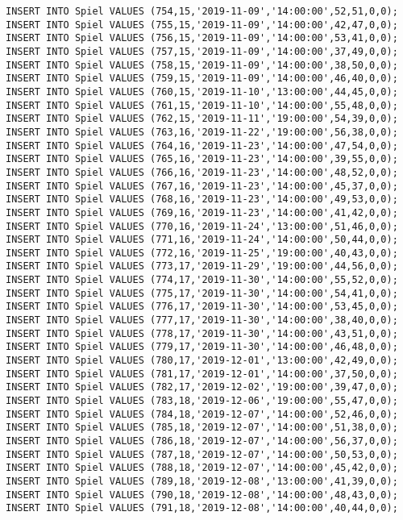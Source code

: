 \documentclass{bschlangaul-aufgabe}
\begin{document}
\begin{verbatim}
INSERT INTO Spiel VALUES (754,15,'2019-11-09','14:00:00',52,51,0,0);
INSERT INTO Spiel VALUES (755,15,'2019-11-09','14:00:00',42,47,0,0);
INSERT INTO Spiel VALUES (756,15,'2019-11-09','14:00:00',53,41,0,0);
INSERT INTO Spiel VALUES (757,15,'2019-11-09','14:00:00',37,49,0,0);
INSERT INTO Spiel VALUES (758,15,'2019-11-09','14:00:00',38,50,0,0);
INSERT INTO Spiel VALUES (759,15,'2019-11-09','14:00:00',46,40,0,0);
INSERT INTO Spiel VALUES (760,15,'2019-11-10','13:00:00',44,45,0,0);
INSERT INTO Spiel VALUES (761,15,'2019-11-10','14:00:00',55,48,0,0);
INSERT INTO Spiel VALUES (762,15,'2019-11-11','19:00:00',54,39,0,0);
INSERT INTO Spiel VALUES (763,16,'2019-11-22','19:00:00',56,38,0,0);
INSERT INTO Spiel VALUES (764,16,'2019-11-23','14:00:00',47,54,0,0);
INSERT INTO Spiel VALUES (765,16,'2019-11-23','14:00:00',39,55,0,0);
INSERT INTO Spiel VALUES (766,16,'2019-11-23','14:00:00',48,52,0,0);
INSERT INTO Spiel VALUES (767,16,'2019-11-23','14:00:00',45,37,0,0);
INSERT INTO Spiel VALUES (768,16,'2019-11-23','14:00:00',49,53,0,0);
INSERT INTO Spiel VALUES (769,16,'2019-11-23','14:00:00',41,42,0,0);
INSERT INTO Spiel VALUES (770,16,'2019-11-24','13:00:00',51,46,0,0);
INSERT INTO Spiel VALUES (771,16,'2019-11-24','14:00:00',50,44,0,0);
INSERT INTO Spiel VALUES (772,16,'2019-11-25','19:00:00',40,43,0,0);
INSERT INTO Spiel VALUES (773,17,'2019-11-29','19:00:00',44,56,0,0);
INSERT INTO Spiel VALUES (774,17,'2019-11-30','14:00:00',55,52,0,0);
INSERT INTO Spiel VALUES (775,17,'2019-11-30','14:00:00',54,41,0,0);
INSERT INTO Spiel VALUES (776,17,'2019-11-30','14:00:00',53,45,0,0);
INSERT INTO Spiel VALUES (777,17,'2019-11-30','14:00:00',38,40,0,0);
INSERT INTO Spiel VALUES (778,17,'2019-11-30','14:00:00',43,51,0,0);
INSERT INTO Spiel VALUES (779,17,'2019-11-30','14:00:00',46,48,0,0);
INSERT INTO Spiel VALUES (780,17,'2019-12-01','13:00:00',42,49,0,0);
INSERT INTO Spiel VALUES (781,17,'2019-12-01','14:00:00',37,50,0,0);
INSERT INTO Spiel VALUES (782,17,'2019-12-02','19:00:00',39,47,0,0);
INSERT INTO Spiel VALUES (783,18,'2019-12-06','19:00:00',55,47,0,0);
INSERT INTO Spiel VALUES (784,18,'2019-12-07','14:00:00',52,46,0,0);
INSERT INTO Spiel VALUES (785,18,'2019-12-07','14:00:00',51,38,0,0);
INSERT INTO Spiel VALUES (786,18,'2019-12-07','14:00:00',56,37,0,0);
INSERT INTO Spiel VALUES (787,18,'2019-12-07','14:00:00',50,53,0,0);
INSERT INTO Spiel VALUES (788,18,'2019-12-07','14:00:00',45,42,0,0);
INSERT INTO Spiel VALUES (789,18,'2019-12-08','13:00:00',41,39,0,0);
INSERT INTO Spiel VALUES (790,18,'2019-12-08','14:00:00',48,43,0,0);
INSERT INTO Spiel VALUES (791,18,'2019-12-08','14:00:00',40,44,0,0);

\end{verbatim}
\end{document}
